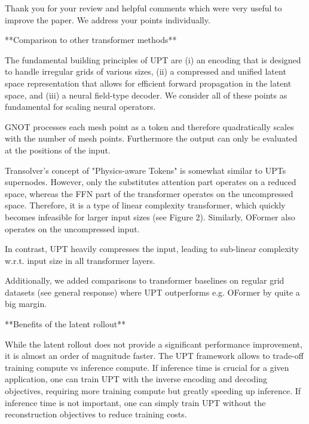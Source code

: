 Thank you for your review and helpful comments which were very useful to improve the paper. We address your points individually.


**Comparison to other transformer methods**







The fundamental building principles of UPT are (i) an encoding that is designed to handle irregular grids of various sizes, (ii) a compressed and unified latent space representation that allows for efficient forward propagation in the latent space, and (iii) a neural field-type decoder. We consider all of these points as fundamental for scaling neural operators.

GNOT processes each mesh point as a token and therefore quadratically scales with the number of mesh points.
Furthermore the output can only be evaluated at the positions of the input.

Transolver's concept of "Physics-aware Tokens" is somewhat similar to UPTs supernodes.
However, only the substitutes attention part operates on a reduced space, whereas the FFN part of the transformer operates on the uncompressed space. Therefore, it is a type of linear complexity transformer, which quickly becomes infeasible for larger input sizes (see Figure 2).
Similarly, OFormer also operates on the uncompressed input.

In contrast, UPT heavily compresses the input, leading to sub-linear complexity w.r.t. input size in all transformer layers.

Additionally, we added comparisons to transformer baselines on regular grid datasets (see general response) where UPT outperforms e.g. OFormer by quite a big margin.













**Benefits of the latent rollout**

While the latent rollout does not provide a significant performance improvement, it is almost an order of magnitude faster.
The UPT framework allows to trade-off training compute vs inference compute. If inference time is crucial for a given application, one can train UPT with the inverse encoding and decoding objectives, requiring more training compute but greatly speeding up inference. If inference time is not important, one can simply train UPT without the reconstruction objectives to reduce training costs.

